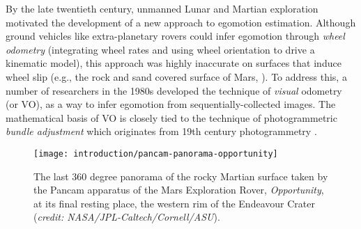 By the late twentieth century, unmanned Lunar and Martian exploration motivated the development of a new approach to egomotion estimation. Although ground vehicles like extra-planetary rovers could infer egomotion through \textit{wheel odometry} (integrating wheel rates and using wheel orientation to drive a kinematic model), this approach was highly inaccurate on surfaces that induce wheel slip (e.g., the rock and sand covered surface of Mars, ). To address this, a number of researchers in the 1980s developed the technique of \textit{visual} odometry \citep{Scaramuzza2011-qr} (or VO), as a way to infer egomotion from sequentially-collected images. The mathematical basis of VO is closely tied to the technique of photogrammetric \textit{bundle adjustment} \citep{triggs_bundle_2000} which originates from 19th century photogrammetry \citep{albertz_look_2007}.





% 
\begin{figure}
  \begin{center}
  	\vspace{-10pt}
    \texttt{[image: introduction/pancam-panorama-opportunity]}
     \vspace{-15pt}
  \end{center}
  \caption{The last 360 degree panorama of the rocky Martian surface taken by the Pancam apparatus of the Mars Exploration Rover, \textit{Opportunity}, at its final resting place, the western rim of the Endeavour Crater (\textit{credit: NASA/JPL-Caltech/Cornell/ASU}).}
    \label{fig:intro_endeavour_crater}
\end{figure}







